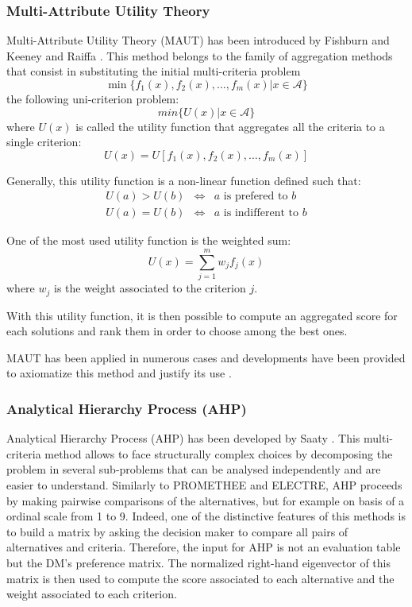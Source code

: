 \subsubsection{Multi-Attribute Utility Theory}
Multi-Attribute Utility Theory (MAUT) has been introduced by Fishburn \cite{Fishburn70} and Keeney and Raiffa \cite{KeeneyRaiffa76}. This method belongs to the family of aggregation methods that consist in substituting the initial multi-criteria problem
\begin{equation}
\min \{f_1(x), f_2(x), \dots, f_m(x) | x \in \mathcal{A}\}
\end{equation}
the following uni-criterion problem:
\begin{equation}
min \{U(x) | x \in \mathcal{A}\}
\end{equation}
where $U(x)$ is called the utility function that aggregates all the criteria to a single criterion:
\begin{equation}
U(x) = U[f_1(x), f_2(x), \dots, f_m(x)]
\end{equation}

Generally, this utility function is a non-linear function defined such that:
\begin{eqnarray}
U(a) > U(b) &\Leftrightarrow& a \text{ is prefered to } b\\
U(a) = U(b) &\Leftrightarrow& a \text{ is indifferent to } b
\end{eqnarray}

One of the most used utility function is the weighted sum:
\begin{equation}
U(x) = \sum_{j=1}^{m} w_j f_j(x)
\end{equation}
where $w_j$ is the weight associated to the criterion $j$.

With this utility function, it is then possible to compute an aggregated score for each solutions and rank them in order to choose among the best ones.

MAUT has been applied in numerous cases and developments have been provided to axiomatize this method and justify its use \cite{MMAUT}.

\subsubsection{Analytical Hierarchy Process (AHP)}
Analytical Hierarchy Process (AHP) has been developed by Saaty \cite{MAHP}. This multi-criteria method allows to face structurally complex choices by decomposing the problem in several sub-problems that can be analysed independently and are easier to understand. Similarly to PROMETHEE and ELECTRE, AHP proceeds by making pairwise comparisons of the alternatives, but for example on basis of a ordinal scale from 1 to 9. Indeed, one of the distinctive features of this methods is to build a matrix by asking the decision maker to compare all pairs of alternatives and criteria. Therefore, the input for AHP is not an evaluation table but the DM's preference matrix. The normalized right-hand eigenvector of this matrix is then used to compute the score associated to each alternative and the weight associated to each criterion. 

